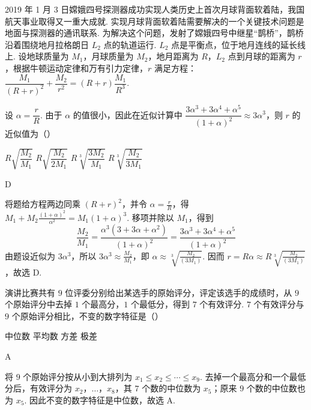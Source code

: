 \begin{problem}
2019 年 1 月 3 日嫦娥四号探测器成功实现人类历史上首次月球背面软着陆，我国航天事业取得又一重大成就. 实现月球背面软着陆需要解决的一个关键技术问题是地面与探测器的通讯联系. 为解决这个问题，发射了嫦娥四号中继星“鹊桥”，鹊桥沿着围绕地月拉格朗日 \(L_2\) 点的轨道运行. \(L_2\) 点是平衡点，位于地月连线的延长线上. 设地球质量为 \(M_1\)，月球质量为 \(M_2\)，地月距离为 \(R\)，\(L_2\) 点到月球的距离为 \(r\)，根据牛顿运动定律和万有引力定律，\(r\) 满足方程：\(\dfrac{M_1}{(R+r)^2}+\dfrac{M_2}{r^2}=(R+r)\dfrac{M_1}{R^3}\).

设 \(\alpha=\dfrac rR\). 由于 \(\alpha\) 的值很小，因此在近似计算中 \(\dfrac{3\alpha^3+3\alpha^4+\alpha^5}{(1+\alpha)^2}\approx 3\alpha^3\)，则 \(r\) 的近似值为（\quad）

\choices
    {\(R\sqrt{\dfrac{M_2}{M_1}}\)}
    {\(R\sqrt{\dfrac{M_2}{2M_1}}\)}
    {\(R\sqrt[3]{\dfrac{3M_2}{M_1}}\)}
    {\(R\sqrt[3]{\dfrac{M_2}{3M_1}}\)}
\end{problem}

\begin{answer}
D
\end{answer}

\begin{solution}
将题给方程两边同乘 \((R+r)^2\)，并令 \(\alpha=\frac{r}{R}\)，得 \(M_1+M_2\frac{(1+\alpha)^2}{\alpha^2}=M_1(1+\alpha)^3\). 移项并除以 \(M_1\)，得到
\[
\frac{M_2}{M_1}=\frac{\alpha^3(3+3\alpha+\alpha^2)}{(1+\alpha)^2}=\frac{3\alpha^3+3\alpha^4+\alpha^5}{(1+\alpha)^2}
\]
由题设近似为 \(3\alpha^3\)，所以 \(3\alpha^3\approx \frac{M_2}{M_1}\)，即 \(\alpha\approx\sqrt[3]{\frac{M_2}{(3M_1)}}\). 因而 \(r=R\alpha\approx R\sqrt[3]{\frac{M_2}{(3M_1)}}\)，故选 D.
\end{solution}

\begin{problem}
演讲比赛共有 \(9\) 位评委分别给出某选手的原始评分，评定该选手的成绩时，从 \(9\) 个原始评分中去掉 \(1\) 个最高分，\(1\) 个最低分，得到 \(7\) 个有效评分. \(7\) 个有效评分与 \(9\) 个原始评分相比，不变的数字特征是（\quad）

\choices
    {中位数}
    {平均数}
    {方差}
    {极差}
\end{problem}

\begin{answer}
A
\end{answer}

\begin{solution}
将 \(9\) 个原始评分按从小到大排列为 \(x_1\leq x_2\leq\cdots\leq x_9\). 去掉一个最高分和一个最低分后，有效评分为 \(x_2\)，\(\ldots\)，\(x_8\)，其 \(7\) 个数的中位数为 \(x_5\)；原来 \(9\) 个数的中位数也为 \(x_5\). 因此不变的数字特征是中位数，故选 A.
\end{solution}

